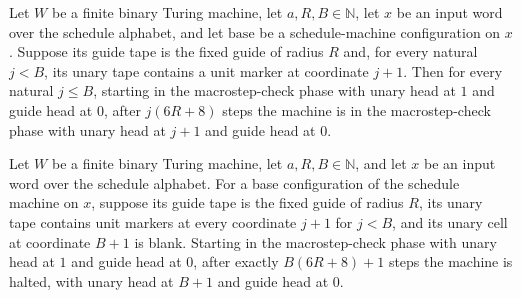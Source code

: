 \begin{lemma}
\label{Complexity.macroCfg_repeat}
\leanok
{}
Let $W$ be a finite binary Turing machine, let $a,R,B\in\mathbb{N}$, let $x$ be an input
word over the schedule alphabet, and let $\mathrm{base}$ be a schedule-machine
configuration on $x$. Suppose its guide tape is the fixed guide of radius $R$ and, for
every natural $j<B$, its unary tape contains a unit marker at coordinate $j+1$. Then for
every natural $j\le B$, starting in the macrostep-check phase with unary head at $1$ and
guide head at $0$, after $j(6R+8)$ steps the machine is in the macrostep-check phase
with unary head at $j+1$ and guide head at $0$.
\end{lemma}

\begin{lemma}
\label{Complexity.macroCfg_finish}
\leanok
{}
Let $W$ be a finite binary Turing machine, let $a,R,B\in\mathbb{N}$, and let $x$ be an
input word over the schedule alphabet. For a base configuration of the schedule machine
on $x$, suppose its guide tape is the fixed guide of radius $R$, its unary tape contains
unit markers at every coordinate $j+1$ for $j<B$, and its unary cell at coordinate $B+1$
is blank. Starting in the macrostep-check phase with unary head at $1$ and guide head at
$0$, after exactly $B(6R+8)+1$ steps the machine is halted, with unary head at $B+1$ and
guide head at $0$.
\end{lemma}
